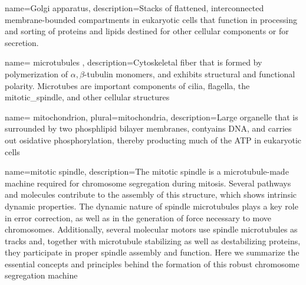 

 {
	name={Golgi apparatus},
	description={Stacks of flattened, interconnected membrane-bounded compartments in eukaryotic cells that function in processing and sorting of proteins and lipids destined for other cellular components or for secretion.\cite{lodish2003molecular}}}



 {
	name= {microtubules} ,
	description={Cytoskeletal fiber that is formed by polymerization of $\alpha,\beta$-tubulin monomers, and exhibits structural and functional polarity. Microtubes are important components of cilia, flagella, the \gls{mitotic_spindle}, and other cellular structures\cite{lodish2003molecular}}}


 {
	name= {mitochondrion},
	plural={mitochondria},
	description={Large \gls{organelle} that is surrounded by two phosphlipid bilayer membranes, contyains DNA, and carries out osidative phosphorylation, thereby producting much of the \gls{ATP} in eukaryotic cells\cite{lodish2003molecular} }}


 {
	name={mitotic spindle},
	description={The mitotic spindle is a microtubule-made machine required for chromosome segregation during mitosis. Several pathways and molecules contribute to the assembly of this structure, which shows intrinsic dynamic properties. The dynamic nature of spindle microtubules plays a key role in error correction, as well as in the generation of force necessary to move chromosomes. Additionally, several molecular motors use spindle microtubules as tracks and, together with microtubule stabilizing as well as destabilizing proteins, they participate in proper spindle assembly and function. Here we summarize the essential concepts and principles behind the formation of this robust chromosome segregation machine\cite{bradshaw2015encyclopedia}}}

